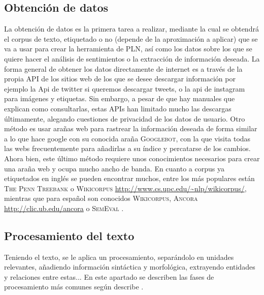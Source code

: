 \subsection{Obtención de datos}
La obtención de datos es la primera tarea a realizar, mediante la cual se obtendrá el corpus de texto, etiquetado o no (depende de la aproximación a aplicar) que se va a usar para crear la herramienta de PLN, así como los datos sobre los que se quiere hacer el análisis de sentimientos o la extracción de información deseada. \newline
La forma general de obtener los datos directamente de internet es a través de la propia API de los sitios web de los que se desee descargar información por ejemplo la Api de twitter si queremos descargar tweets, o la api de instagram para imágenes y etiquetas. Sin embargo, a pesar de que hay manuales que explican como consultarlas, estas APIs  han limitado mucho las descargas últimamente, alegando cuestiones de privacidad de los datos de usuario. Otro método es usar arañas web para rastrear la información deseada de forma similar a lo que hace google con su conocida araña \textsc{Googlebot}, con la que visita todas las webs frecuentemente para añadirlas a su índice y percatarse de los cambios. Ahora bien, este último método requiere unos conocimientos necesarios para crear una araña web y ocupa mucho ancho de banda. \newline
En cuanto a corpus ya etiquetados en inglés se pueden encontrar muchos, entre los más populares están \textsc{The Penn Treebank} \citet{marcus1993building} o \textsc{Wikicorpus} \url{http://www.cs.upc.edu/~nlp/wikicorpus/}, mientras que para español son conocidos \textsc{Wikicorpus}, \textsc{Ancora} \url{http://clic.ub.edu/ancora} o \textsc{SemEval} \citet{marquez2007semeval}. 
    
\subsection{Procesamiento del texto}
Teniendo el texto, se le aplica un procesamiento, separándolo en unidades relevantes, añadiendo información sintáctica y morfológica, extrayendo entidades y relaciones entre estas... En este apartado se describen las fases de procesamiento más comunes según describe \citet{9783319155623}.
